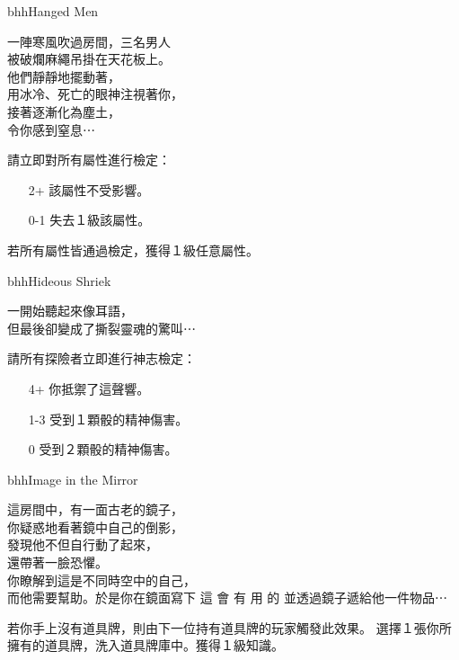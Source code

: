 \linebreak[0]%
\begin{EventCard}{bhh}{Hanged Men}
  \begin{CardStory}
    一陣寒風吹過房間，三名男人\\
    被破爛麻繩吊掛在天花板上。\\
    他們靜靜地擺動著，\\
    用冰冷、死亡的眼神注視著你，\\
    接著逐漸化為塵土，\\
    令你感到窒息⋯
  \end{CardStory}
  請立即對所有屬性進行檢定：
  \begin{itemize}
    \item[2+] 該屬性不受影響。
    \item[0-1] 失去１級該屬性。
  \end{itemize}
  若所有屬性皆通過檢定，獲得１級任意屬性。\smallbreak
\end{EventCard}%
\linebreak[0]%
\begin{EventCard}{bhh}{Hideous Shriek}
  \begin{CardStory}
    一開始聽起來像耳語，\\
    但最後卻變成了撕裂靈魂的驚叫⋯
  \end{CardStory}
  請所有探險者立即進行神志檢定：
  \begin{itemize}
    \item[4+] 你抵禦了這聲響。
    \item[1-3] 受到１顆骰的精神傷害。
    \item[0] 受到２顆骰的精神傷害。
  \end{itemize}
\end{EventCard}%
\linebreak[0]%
\begin{EventCard}{bhh}{Image in the Mirror}
  \begin{CardStory}
    這房間中，有一面古老的鏡子，\\
    你疑惑地看著鏡中自己的倒影，\\
    發現他不但自行動了起來，\\
    還帶著一臉恐懼。\\
    你瞭解到這是不同時空中的自己，\\
    而他需要幫助。於是你在鏡面寫下\smallbreak
    { \FontScript 這 \enskip 會 \enskip 有 \enskip 用 \enskip 的 }\smallbreak
    並透過鏡子遞給他一件物品⋯
\end{CardStory}
  若你手上沒有道具牌，則由下一位持有道具牌的玩家觸發此效果。\smallbreak
  選擇１張你所擁有的道具牌，洗入道具牌庫中。獲得１級知識。\smallbreak
\end{EventCard}%
